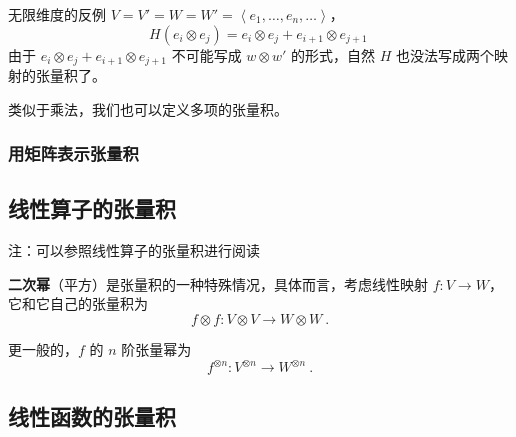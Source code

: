

\begin{example}{无限维度的反例}
$V = V' = W = W' = \left\langle e_1, \dots, e_n, \dots \right\rangle$，
\begin{equation}
H(e_i \otimes e_j) = e_i \otimes e_j + e_{i + 1} \otimes e_{j + 1}~
\end{equation}
由于 $e_i \otimes e_j + e_{i + 1} \otimes e_{j + 1}$ 不可能写成 $w \otimes w'$ 的形式，自然 $H$ 也没法写成两个映射的张量积了。

\end{example}

类似于乘法，我们也可以定义多项的张量积。

\subsubsection{用矩阵表示张量积}


\subsection{线性算子的张量积}

注：可以参照线性算子的张量积进行阅读


\textbf{二次幂}（平方）是张量积的一种特殊情况，具体而言，考虑线性映射 $f: V \to W$，它和它自己的张量积为
\begin{equation}
f \otimes f: V \otimes V \to W \otimes W~.
\end{equation}

更一般的，$f$ 的 $n$ 阶张量幂为
\begin{equation}
f^{\otimes n}: V^{\otimes n} \to W^{\otimes n}~.
\end{equation}

\subsection{线性函数的张量积}


